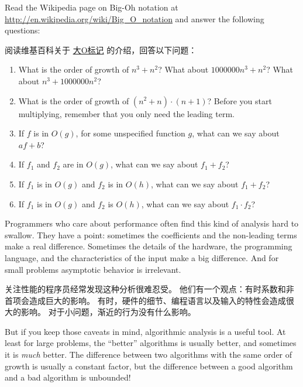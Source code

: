 \begin{exercise}

Read the Wikipedia page on Big-Oh notation at
\url{http://en.wikipedia.org/wiki/Big_O_notation} and
answer the following questions:

阅读维基百科关于 \href{http://en.wikipedia.org/wiki/Big_O_notation}{大O标记} 的介绍，回答以下问题：

\begin{enumerate}
\item What is the order of growth of $n^3 + n^2$?
What about $1000000 n^3 + n^2$?
What about $n^3 + 1000000 n^2$?

\item What is the order of growth of $(n^2 + n) \cdot (n + 1)$?  Before
  you start multiplying, remember that you only need the leading term.

\item If $f$ is in $O(g)$, for some unspecified function $g$, what can
  we say about $af+b$?

\item If $f_1$ and $f_2$ are in $O(g)$, what can we say about $f_1 + f_2$?

\item If  $f_1$ is in $O(g)$
and $f_2$ is in $O(h)$,
what can we say about  $f_1 + f_2$?

\item If  $f_1$ is in $O(g)$ and $f_2$ is $O(h)$,
what can we say about  $f_1 \cdot f_2$?
\end{enumerate}

\end{exercise}

Programmers who care about performance often find this kind of
analysis hard to swallow.  They have a point: sometimes the
coefficients and the non-leading terms make a real difference.
Sometimes the details of the hardware, the programming language, and
the characteristics of the input make a big difference.  And for small
problems asymptotic behavior is irrelevant.

关注性能的程序员经常发现这种分析很难忍受。
他们有一个观点：有时系数和非首项会造成巨大的影响。
有时，硬件的细节、编程语言以及输入的特性会造成很大的影响。
对于小问题，渐近的行为没有什么影响。

But if you keep those caveats in mind, algorithmic analysis is a
useful tool.  At least for large problems, the ``better'' algorithms
is usually better, and sometimes it is {\em much} better.  The
difference between two algorithms with the same order of growth is
usually a constant factor, but the difference between a good algorithm
and a bad algorithm is unbounded!

